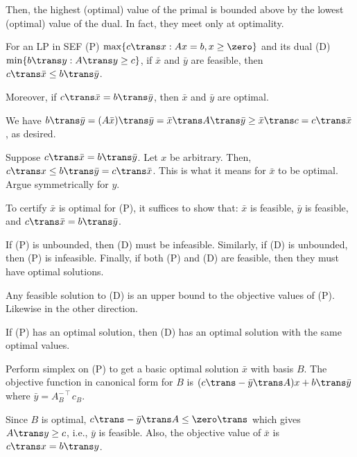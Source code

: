 Then, the highest (optimal) value of the primal is bounded above by
the lowest (optimal) value of the dual.
In fact, they meet only at optimality.

\begin{theorem}
  For an LP in SEF (P) $\max\{c\trans x : Ax = b, x \geq \zero\}$
  and its dual (D) $\min\{b\trans y : A\trans y \geq c\}$,
  if $\bar x$ and $\bar y$ are feasible,
  then $c\trans\bar x \leq b\trans\bar y$.

  Moreover, if $c\trans\bar x = b\trans\bar y$,
  then $\bar x$ and $\bar y$ are optimal.
\end{theorem}
\begin{prf}
  We have $b\trans \bar y = (A\bar x)\trans \bar y =\bar x\trans A\trans \bar y \geq \bar x\trans c = c\trans \bar x$,
  as desired.

  Suppose $c\trans \bar x = b\trans \bar y$.
  Let $x$ be arbitrary.
  Then, $c\trans x \leq b\trans \bar y = c\trans \bar x$.
  This is what it means for $\bar x$ to be optimal.
  Argue symmetrically for $y$.
\end{prf}

\begin{corollary}
  To certify $\bar x$ is optimal for (P), it suffices to show that:
  $\bar x$ is feasible, $\bar y$ is feasible, and $c\trans \bar x = b\trans \bar y$.
\end{corollary}

\begin{corollary}
  If (P) is unbounded, then (D) must be infeasible.
  Similarly, if (D) is unbounded, then (P) is infeasible.
  Finally, if both (P) and (D) are feasible,
  then they must have optimal solutions.
\end{corollary}
\begin{prf}
  Any feasible solution to (D) is an upper bound to the
  objective values of (P). Likewise in the other direction.
\end{prf}

\begin{theorem}
  If (P) has an optimal solution,
  then (D) has an optimal solution with the same optimal values.
\end{theorem}
\begin{prf}
  Perform simplex on (P) to get a basic optimal solution $\bar x$ with basis $B$.
  The objective function in canonical form for $B$
  is $(c\trans - \bar y\trans A)x + b\trans \bar y$
  where $\bar y = A_B^{-\intercal}c_B$.

  Since $B$ is optimal, $c\trans - \bar y\trans A \leq \zero\trans$
  which gives $A\trans y \geq c$, i.e., $\bar y$ is feasible.
  Also, the objective value of $\bar x$ is $c\trans x = b\trans y$.
\end{prf}

